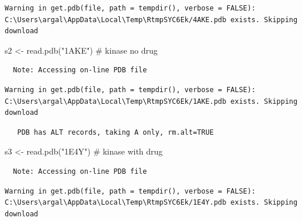 \documentclass[
  letterpaper,
  DIV=11,
  numbers=noendperiod]{scrartcl}
\newenvironment{Shaded}{\begin{snugshade}}{\end{snugshade}}
\newcommand{\CommentTok}[1]{\textcolor[rgb]{0.37,0.37,0.37}{#1}}
\newcommand{\FunctionTok}[1]{\textcolor[rgb]{0.28,0.35,0.67}{#1}}
\newcommand{\NormalTok}[1]{\textcolor[rgb]{0.00,0.23,0.31}{#1}}
\newcommand{\OtherTok}[1]{\textcolor[rgb]{0.00,0.23,0.31}{#1}}
\newcommand{\StringTok}[1]{\textcolor[rgb]{0.13,0.47,0.30}{#1}}
\begin{document}
\begin{verbatim}
Warning in get.pdb(file, path = tempdir(), verbose = FALSE):
C:\Users\argal\AppData\Local\Temp\RtmpSYC6Ek/4AKE.pdb exists. Skipping download
\end{verbatim}

\begin{Shaded}
\begin{Highlighting}[]
\NormalTok{s2 }\OtherTok{\textless{}{-}} \FunctionTok{read.pdb}\NormalTok{(}\StringTok{"1AKE"}\NormalTok{) }\CommentTok{\# kinase no drug}
\end{Highlighting}
\end{Shaded}

\begin{verbatim}
  Note: Accessing on-line PDB file
\end{verbatim}

\begin{verbatim}
Warning in get.pdb(file, path = tempdir(), verbose = FALSE):
C:\Users\argal\AppData\Local\Temp\RtmpSYC6Ek/1AKE.pdb exists. Skipping download
\end{verbatim}

\begin{verbatim}
   PDB has ALT records, taking A only, rm.alt=TRUE
\end{verbatim}

\begin{Shaded}
\begin{Highlighting}[]
\NormalTok{s3 }\OtherTok{\textless{}{-}} \FunctionTok{read.pdb}\NormalTok{(}\StringTok{"1E4Y"}\NormalTok{) }\CommentTok{\# kinase with drug}
\end{Highlighting}
\end{Shaded}

\begin{verbatim}
  Note: Accessing on-line PDB file
\end{verbatim}

\begin{verbatim}
Warning in get.pdb(file, path = tempdir(), verbose = FALSE):
C:\Users\argal\AppData\Local\Temp\RtmpSYC6Ek/1E4Y.pdb exists. Skipping download
\end{verbatim}
\end{document}

